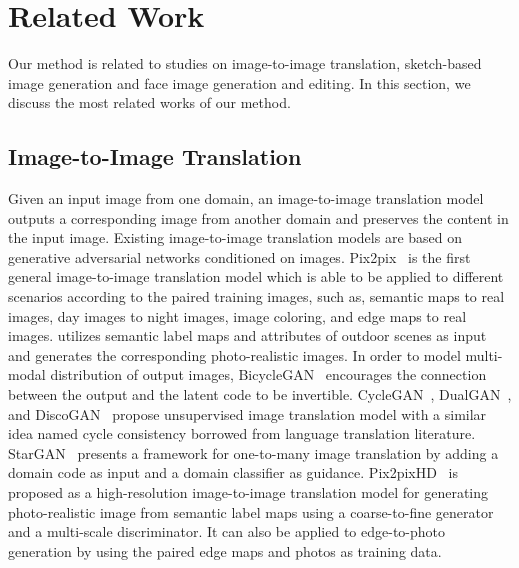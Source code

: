 \section{Related Work}
Our method is related to studies on image-to-image translation, sketch-based image generation and face image generation and editing.
In this section, we discuss the most related works of our method. 


\subsection{Image-to-Image Translation}
Given an input image from one domain, an image-to-image translation model outputs a corresponding image from another domain and preserves the content in the input image. Existing image-to-image translation models are based on generative adversarial networks conditioned on images. 
%
Pix2pix~\cite{pix2pix} is the first general image-to-image translation model which is able to be applied to different scenarios according to the paired training images, such as, semantic maps to real images, day images to night images, image coloring, and edge maps to real images. 
%
\cite{outdoor_scene} utilizes semantic label maps and attributes of outdoor scenes as input and generates the corresponding photo-realistic images.
%
In order to model multi-modal distribution of output images, BicycleGAN~\cite{BicycleGAN} encourages the connection between the output and the latent code to be invertible.
%
CycleGAN~\cite{CycleGAN}, DualGAN~\cite{DualGAN}, and DiscoGAN~\cite{DiscoGAN} propose unsupervised image translation model with a similar idea named cycle consistency borrowed from language translation literature. 
%
StarGAN~\cite{StarGAN} presents a framework for one-to-many image translation by adding a domain code as input and a domain classifier as guidance.
%
Pix2pixHD~\cite{pix2pixHD} is proposed as a high-resolution image-to-image translation model for generating photo-realistic image from semantic label maps using a coarse-to-fine generator and a multi-scale discriminator. It can also be applied to edge-to-photo generation by using the paired edge maps and photos as training data.
%

